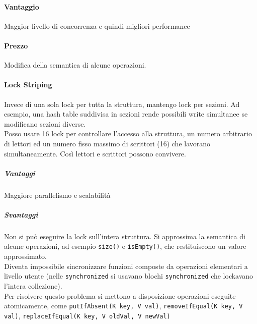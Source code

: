 \documentclass[10pt]{article}
\begin{document}
\paragraph{Vantaggio} Maggior livello di concorrenza e quindi migliori performance
\paragraph{Prezzo} Modifica della semantica di alcune operazioni.
\paragraph{Lock Striping} Invece di una sola lock per tutta la struttura, mantengo lock per sezioni. Ad esempio, una hash table suddivisa in sezioni rende possibili write simultanee se modificano sezioni diverse.\\
Posso usare 16 lock per controllare l'accesso alla struttura, un numero arbitrario di lettori ed un numero fisso massimo di scrittori (16) che lavorano simultaneamente. Così lettori e scrittori possono convivere.
\subparagraph{Vantaggi} Maggiore parallelismo e scalabilità
\subparagraph{Svantaggi} Non si può eseguire la lock sull'intera struttura. Si approssima la semantica di alcune operazioni, ad esempio \texttt{size()} e \texttt{isEmpty()}, che restituiscono un valore approssimato.\\
Diventa impossibile sincronizzare funzioni composte da operazioni elementari a livello utente (nelle \texttt{synchronized} si usavano blochi \texttt{synchronized} che lockavano l'intera collezione).\\
Per risolvere questo problema si mettono a disposizione operazioni eseguite atomicamente, come \texttt{putIfAbsent(K key, V val)}, \texttt{removeIfEqual(K key, V val)}, \texttt{replaceIfEqual(K key, V oldVal, V newVal)}
\end{document}
